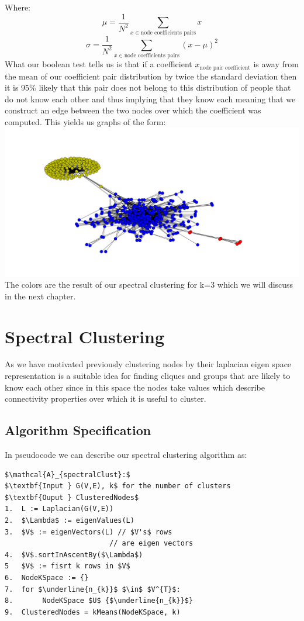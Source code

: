 \documentclass[10pt,twocolumn]{article}
\begin{document}
Where: $$\mu = \frac{1}{N^{2}}\sum_{x \in \text{node coefficients pairs} } x$$  $$\sigma = \frac{1}{N^{2}}\sum_{x \in \text{node coefficients pairs} } (x- \mu)^{2}$$
What our boolean test tells us is that if a coefficient $x_{\text{node pair coefficient}}$ is away from the mean of our coefficient pair distribution by twice the standard deviation then it is 95\%  likely that this pair does not belong to this distribution of people that do not know each other and thus implying that they know each meaning that we construct an edge between the two nodes over which the coefficient was computed. This yields us graphs of the form:
\hspace*{-2cm}
\includegraphics[scale=0.2]{pics/spring.png}
The colors are the result of our spectral clustering
for k=3 which we will discuss in the next chapter.
\section{Spectral Clustering}
As we have motivated previously clustering nodes by their laplacian eigen space representation is a suitable idea for finding cliques and groups that are likely to know each other since in this space the nodes take values which describe connectivity properties over which it is useful to cluster.
\subsection{Algorithm Specification}
In pseudocode we can describe our spectral clustering algorithm as:
\begin{lstlisting}[mathescape]
$\mathcal{A}_{spectralClust}:$
$\textbf{Input } G(V,E), k$ for the number of clusters
$\textbf{Ouput } ClusteredNodes$
1.  L := Laplacian(G(V,E))
2.  $\Lambda$ := eigenValues(L)
3.  $V$ := eigenVectors(L) // $V's$ rows
                         // are eigen vectors
4.  $V$.sortInAscentBy($\Lambda$)
5   $V$ := fisrt k rows in $V$
6.  NodeKSpace := {}
7.  for $\underline{n_{k}}$ $\in$ $V^{T}$:
8.       NodeKSpace $U$ {$\underline{n_{k}}$}
9.  ClusteredNodes = kMeans(NodeKSpace, k)
\end{lstlisting}
\end{document}
